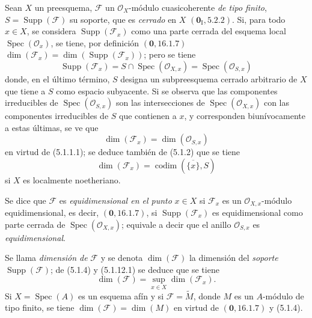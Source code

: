 \begin{env}[5.1.12]
\label{IV.2.5.1.12-fr}
Sean $X$ un preesquema, $\mathcal F$ un $\mathcal O_X$-módulo
cuasicoherente \emph{de tipo finito}, $S=\operatorname{Supp}(\mathcal F)$ su
soporte, que es \emph{cerrado} en $X$ $(\mathbf{0}_{\mathrm I},5.2.2)$. Si, para todo
$x\in X$, se considera $\operatorname{Supp}(\mathcal F_x)$ como una parte
cerrada del esquema local $\operatorname{Spec}(\mathcal O_x)$, se tiene, por
definición $(\mathbf{0},16.1.7)$
$\dim(\mathcal F_x)=\dim(\operatorname{Supp}(\mathcal F_x))$; pero se tiene
\[
\operatorname{Supp}(\mathcal F_x)
=S\cap\operatorname{Spec}(\mathcal O_{X,x})
=\operatorname{Spec}(\mathcal O_{S,x})
\]
donde, en el último término, $S$ designa un subpreesquema cerrado arbitrario de
$X$ que tiene a $S$ como espacio subyacente. Si se observa que las componentes
irreducibles de $\operatorname{Spec}(\mathcal O_{S,x})$ son las
intersecciones de $\operatorname{Spec}(\mathcal O_{X,x})$ con las componentes
irreducibles de $S$ que contienen a $x$, y corresponden biunívocamente a estas
últimas, se ve que
\begin{equation}
\dim(\mathcal F_x)=\dim(\mathcal O_{S,x})
\tag{5.1.12.1}\label{IV.2.5.1.12.1-fr}
\end{equation}
en virtud de (5.1.1.1); se deduce también de (5.1.2) que se tiene
\begin{equation}
\dim(\mathcal F_x)=\operatorname{codim}(\overline{\{x\}},S)
\tag{5.1.12.2}\label{IV.2.5.1.12.2-fr}
\end{equation}
si $X$ es localmente noetheriano.

Se dice que $\mathcal F$ es \emph{equidimensional en el punto} $x\in X$ si
$\mathcal F_x$ es un $\mathcal O_{X,x}$-módulo equidimensional,
es decir, $(\mathbf{0},16.1.7)$, si $\operatorname{Supp}(\mathcal F_x)$ es
equidimensional como parte cerrada de
$\operatorname{Spec}(\mathcal O_{X,x})$; equivale a decir que el anillo
$\mathcal O_{S,x}$ es \emph{equidimensional}.

Se llama \emph{dimensión de} $\mathcal F$ y se denota $\dim(\mathcal F)$ la
dimensión del \emph{soporte} $\operatorname{Supp}(\mathcal F)$; de (5.1.4) y
(5.1.12.1) se deduce que se tiene
\begin{equation}
\dim(\mathcal F)=\sup_{x\in X}\dim(\mathcal F_x).
\tag{5.1.12.3}\label{IV.2.5.1.12.3-fr}
\end{equation}
Si $X=\operatorname{Spec}(A)$ es un esquema afín y si
$\mathcal F=\widetilde M$, donde $M$ es un $A$-módulo de tipo finito, se tiene
$\dim(\mathcal F)=\dim(M)$ en virtud de $(\mathbf{0},16.1.7)$ y (5.1.4).
\end{env}

